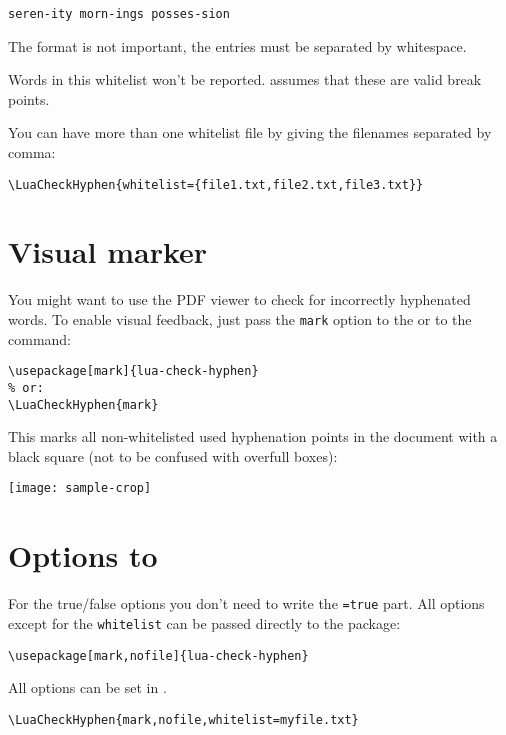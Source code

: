 \documentclass{ltxdockit}
\begin{document}
\begin{verbatim}
seren-ity morn-ings posses-sion
\end{verbatim}

The format is not important, the entries must be separated by whitespace.

Words in this whitelist won't be reported.  assumes that these are valid break points.

You can have more than one whitelist file by giving the filenames separated by comma:

\begin{verbatim}
\LuaCheckHyphen{whitelist={file1.txt,file2.txt,file3.txt}}
\end{verbatim}

\section{Visual marker}

You might want to use the PDF viewer to check for incorrectly hyphenated words. To enable visual feedback, just pass the \texttt{mark} option to the  or to the  command:

\begin{verbatim}
\usepackage[mark]{lua-check-hyphen}
% or:
\LuaCheckHyphen{mark}
\end{verbatim}

This marks all non-whitelisted used hyphenation points in the document with a black square (not to be confused with overfull boxes):

\texttt{[image: sample-crop]}

\section{Options to }

For the true/false options you don't need to write the \texttt{=true} part. All options except for the \texttt{whitelist} can be passed directly to the package:

\begin{verbatim}
\usepackage[mark,nofile]{lua-check-hyphen}
\end{verbatim}

\noindent All options can be set in .

\begin{verbatim}
\LuaCheckHyphen{mark,nofile,whitelist=myfile.txt}
\end{verbatim}
\end{document}
